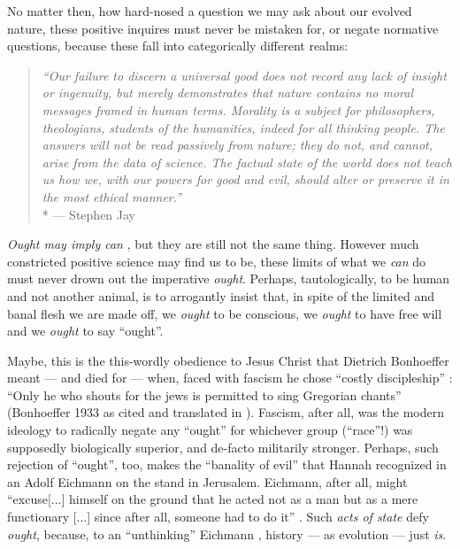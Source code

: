 No matter then, how hard-nosed a question we may ask about our evolved nature, these positive inquires must never be mistaken for, or negate normative questions, because these fall into categorically different realms:
\begin{quote}
	\emph{``Our failure to discern a universal good does not record any lack of insight or ingenuity, but merely demonstrates that nature contains no moral messages framed in human terms.
	Morality is a subject for philosophers, theologians, students of the humanities, indeed for all thinking people.
	The answers will not be read passively from nature; they do not, and cannot, arise from the data of science.
	The factual state of the world does not teach us how we, with our powers for good and evil, should alter or preserve it in the most ethical manner.''}\\*
	--- Stephen Jay \citet[43]{Gould1982}
\end{quote}

\emph{Ought may imply can} \citep[65]{Kant1794}, but they are still not the same thing.
However much constricted positive science may find us to be, these limits of what we \emph{can} do must never drown out the imperative \emph{ought}.
Perhaps, tautologically, to be human and not another animal, is to arrogantly insist that, in spite of the limited and banal flesh we are made off, we \emph{ought} to be conscious, we \emph{ought} to have free will and we \emph{ought} to say ``ought''.

Maybe, this is the this-wordly obedience to Jesus Christ that Dietrich Bonhoeffer meant --- and died for --- when, faced with fascism he chose ``costly discipleship'' \citep{Bonhoeffer1937}: ``Only he who shouts for the jews is permitted to sing Gregorian chants'' (Bonhoeffer 1933 as cited and translated in \citealt[35]{DeGruchy1999}).
Fascism, after all, was the modern ideology to radically negate any ``ought'' for whichever group (``race''!) was supposedly biologically superior, and de-facto militarily stronger.
Perhaps, such rejection of ``ought'', too, makes the ``banality of evil'' that Hannah \cite{Arendt1963} recognized in an Adolf Eichmann on the stand in Jerusalem.
Eichmann, after all, might ``excuse[...] himself on the ground that he acted not as a man but as a mere functionary [...] since after all, someone had to do it'' \citep[K286f.]{Arendt1963}.
Such \emph{acts of state} defy \emph{ought}, because, to an ``unthinking'' Eichmann \citep[K187f.]{Arendt1963}, history --- as evolution --- just \emph{is}.

